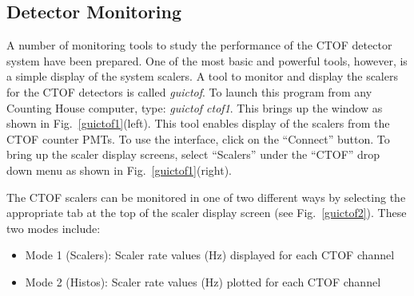 \documentclass[12pt]{article}
\begin{document}
\subsection{Detector Monitoring}
\label{monitoring}

A number of monitoring tools to study the performance of the CTOF detector system have been
prepared. One of the most basic and powerful tools, however, is a simple display of the
system scalers. A tool to monitor and display the scalers for the CTOF detectors is called 
{\it guictof}. To launch this program from any Counting House computer, type: {\it guictof ctof1}.
This brings up the window as shown in Fig.~\ref{guictof1}(left). This tool enables display of
the scalers from the CTOF counter PMTs. To use the interface, click on the ``Connect'' button. 
To bring up the scaler display screens, select ``Scalers'' under the ``CTOF'' drop down menu as 
shown in Fig.~\ref{guictof1}(right).
 
The CTOF scalers can be monitored in one of two different ways by selecting the appropriate tab
at the top of the scaler display screen (see Fig.~\ref{guictof2}). These two modes include:

\begin{itemize}
\item Mode 1 (Scalers): Scaler rate values (Hz) displayed for each CTOF channel
\item Mode 2 (Histos): Scaler rate values (Hz) plotted for each CTOF channel
\end{itemize}
\end{document}
